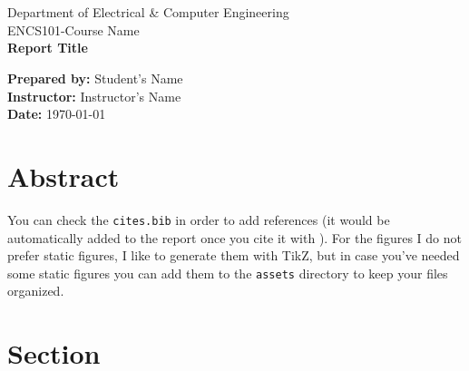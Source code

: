 \documentclass[12pt]{article}
\def \LOGOPATH {assets/birzeit-logo.svg}
\def \DEPARTEMENT {Department of Electrical \& Computer Engineering}
\def \COURSENUM {ENCS101}
\def \COURSENAME {Course Name}
\def \REPORTTITLE {Report Title}
\def \STUDENTNAME {Student's Name}
\def \INSTRUCTOR {Instructor's Name}
\begin{document}

\begin{titlepage}
    \vfill
    \begin{center}
         \\
        \hfill \\
        \Large{\DEPARTEMENT} \\
        \Large{\COURSENUM\;-\;\COURSENAME} \\
        \vfill
        \textbf{\LARGE{\REPORTTITLE}}
    \end{center}
    \vfill
    \begin{flushleft}
        \Large{\textbf{Prepared by:} \STUDENTNAME} \\
        \Large{\textbf{Instructor:} \INSTRUCTOR} \\
        \Large{\textbf{Date:} \today}
    \end{flushleft}
    \vfill
\end{titlepage}

{
\centering
\section*{Abstract}
You can check the \texttt{cites.bib} in order to add references (it would be automatically added to the report once you cite it\cite{rfc3447} with \texttt{\cite{tag}}). For the figures I do not prefer static figures, I like to generate them with TikZ, but in case you've needed some static figures you can add them to the \texttt{assets} directory to keep your files organized.
\clearpage
}


\tableofcontents
\clearpage

\setlength{\parskip}{\baselineskip}%



\section{Section}
\end{document}
